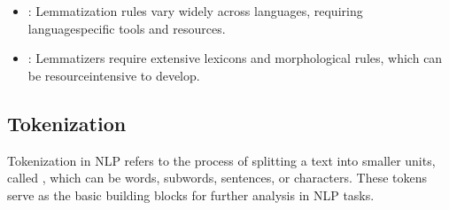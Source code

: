 \documentclass[letterpaper,11pt,english]{sphinxmanual}
\begin{document}
\begin{itemize}
\begin{itemize}
\begin{itemize}
\end{itemize}

\item {} 
\sphinxAtStartPar
{}:
Lemmatization rules vary widely across languages, requiring language\sphinxhyphen{}specific tools and resources.

\item {} 
\sphinxAtStartPar
{}:
Lemmatizers require extensive lexicons and morphological rules, which can be resource\sphinxhyphen{}intensive to develop.

\end{itemize}

\end{itemize}


\subsection{Tokenization}
\label{\detokenize{prelim:tokenization}}
\sphinxAtStartPar
Tokenization in NLP refers to the process of splitting a text into smaller units, called , which
can be words, subwords, sentences, or characters. These tokens serve as the basic building blocks for further
analysis in NLP tasks.
\end{document}
